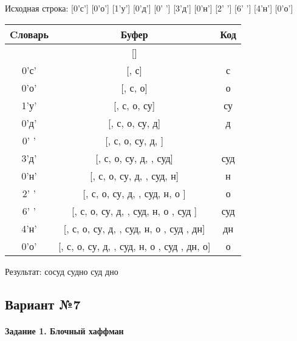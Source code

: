 \documentclass[a4paper, 12pt]{article}
\begin{document}
Исходная строка: [0'с'] [0'о'] [1'у'] [0'д'] [0' '] [3'д'] [0'н'] [2' '] [6' '] [4'н'] [0'о']\\
\begin{table}[h!]
\centering
\begin{tabular}{|c|c|c|}
\hline
 Cловарь & Буфер & Код  \\ \hline
 & [] & 
\\ \hline
0'с' & [, с] & с
\\ \hline
0'о' & [, с, о] & о
\\ \hline
1'у' & [, с, о, су] & су
\\ \hline
0'д' & [, с, о, су, д] & д
\\ \hline
0' ' & [, с, о, су, д,  ] &  
\\ \hline
3'д' & [, с, о, су, д,  , суд] & суд
\\ \hline
0'н' & [, с, о, су, д,  , суд, н] & н
\\ \hline
2' ' & [, с, о, су, д,  , суд, н, о ] & о 
\\ \hline
6' ' & [, с, о, су, д,  , суд, н, о , суд ] & суд 
\\ \hline
4'н' & [, с, о, су, д,  , суд, н, о , суд , дн] & дн
\\ \hline
0'о' & [, с, о, су, д,  , суд, н, о , суд , дн, о] & о
\\ \hline
\end{tabular}
\end{table}

Результат: сосуд судно суд дно
\pagebreak
\subsection{Вариант №7}
\paragraph{Задание 1. Блочный хаффман \\}
\end{document}
